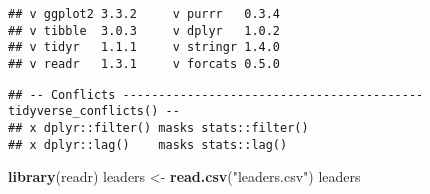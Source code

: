 \documentclass[
]{article}
\newenvironment{Shaded}{\begin{snugshade}}{\end{snugshade}}
\newcommand{\KeywordTok}[1]{\textcolor[rgb]{0.13,0.29,0.53}{\textbf{#1}}}
\newcommand{\NormalTok}[1]{#1}
\newcommand{\StringTok}[1]{\textcolor[rgb]{0.31,0.60,0.02}{#1}}
\begin{document}
\begin{verbatim}
## v ggplot2 3.3.2     v purrr   0.3.4
## v tibble  3.0.3     v dplyr   1.0.2
## v tidyr   1.1.1     v stringr 1.4.0
## v readr   1.3.1     v forcats 0.5.0
\end{verbatim}

\begin{verbatim}
## -- Conflicts ------------------------------------------ tidyverse_conflicts() --
## x dplyr::filter() masks stats::filter()
## x dplyr::lag()    masks stats::lag()
\end{verbatim}

\begin{Shaded}
\begin{Highlighting}[]
\KeywordTok{library}\NormalTok{(readr)}
\NormalTok{leaders <-}\StringTok{ }\KeywordTok{read.csv}\NormalTok{(}\StringTok{"leaders.csv"}\NormalTok{)}
\NormalTok{leaders}
\end{Highlighting}
\end{Shaded}
\end{document}
